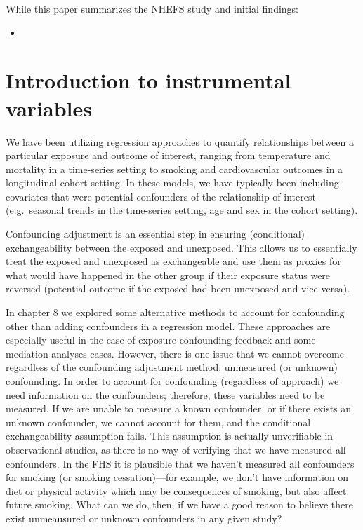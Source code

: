 \documentclass[
]{book}
\providecommand{\tightlist}{%
  \setlength{\itemsep}{0pt}\setlength{\parskip}{0pt}}
\begin{document}
While this paper summarizes the NHEFS study and initial findings:

\begin{itemize}
\tightlist
\item
  \citet{madans198610}
\end{itemize}

\hypertarget{introduction-to-instrumental-variables}{%
\section{Introduction to instrumental variables}\label{introduction-to-instrumental-variables}}

We have been utilizing regression approaches to quantify relationships between
a particular exposure and outcome of interest, ranging from temperature and mortality in a time-series setting to smoking and cardiovascular outcomes in a longitudinal cohort setting. In these models, we have typically been including covariates that were potential confounders of the relationship of interest (e.g.~seasonal trends in the time-series setting, age and sex in the cohort setting).

Confounding adjustment is an essential step in ensuring (conditional) exchangeability between the exposed and unexposed. This allows us to essentially treat the exposed and unexposed as exchangeable and use them as proxies for what would have happened in the other group if their exposure status were reversed (potential outcome if the exposed had been unexposed and vice versa).

In chapter 8 we explored some alternative methods to account for confounding other
than adding confounders in a regression model. These approaches are especially
useful in the case of exposure-confounding feedback and some mediation analyses
cases. However, there is one issue that we cannot overcome regardless of the confounding adjustment method: unmeasured (or unknown) confounding. In order to account for confounding (regardless of approach) we need information on the confounders; therefore, these variables need to be measured. If we are unable to measure a known confounder, or if there exists an unknown confounder, we cannot account for them, and the conditional exchangeability assumption fails. This assumption is actually unverifiable in observational studies, as there is no way of verifying that we have measured all confounders. In the FHS it is plausible that we haven't measured all confounders for smoking (or smoking cessation)---for example, we don't have information on diet or physical activity which may be consequences of smoking, but also affect future smoking. What can we do, then, if we have a good reason to believe there exist unmeausured or unknown confounders in any given study?
\end{document}
